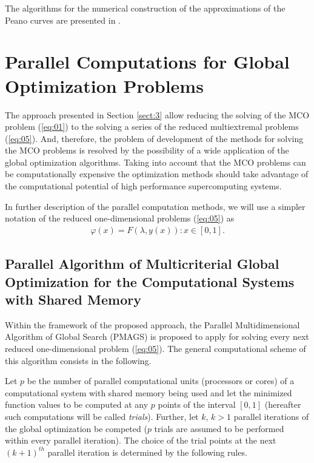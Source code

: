 \documentclass[procedia]{easychair}
\begin{document}
The algorithms for the numerical construction of the approximations of the Peano curves are presented in \cite{c35}.

\section{Parallel Computations for Global Optimization Problems}
\label{sect:4}
The approach presented in Section \ref{sect:3} allow reducing the solving of the MCO problem (\ref{eq:01}) to the solving a series of the reduced multiextremal problems (\ref{eq:05}). And, therefore, the problem of development of the methods for solving the MCO problems is resolved by the possibility of a wide application of the global optimization algorithms. Taking into account that the MCO problems can be computationally expensive the optimization methods should take advantage of the computational potential of high performance supercomputing systems. \par

In further description of the parallel computation methods, we will use a simpler notation of the reduced one-dimensional problems (\ref{eq:05}) as
\begin{eqnarray} \label{eq:07}
\varphi(x) = F(\lambda,y(x)): x \in [0,1]. 
\end{eqnarray}


\subsection{Parallel Algorithm of Multicriterial Global Optimization for the Computational Systems with Shared Memory}
\label{sect:4_1}
Within the framework of the proposed approach, the Parallel Multidimensional Algorithm of Global Search (PMAGS) \cite{c1,c15,c13,c16,c35,c33} is proposed to apply for solving every next reduced one-dimensional problem (\ref{eq:05}). The general computational scheme of this algorithm consists in the following.\par

Let $p$ be the number of parallel computational units (processors or cores) of a computational system with shared memory being used and let the minimized function values to be computed at any $p$ points of the interval $[0,1]$ (hereafter such computations will be called {\it trials}). Further, let $k$, $k>1$ parallel iterations of the global optimization be competed ($p$ trials are assumed to be performed within every parallel iteration). The choice of the trial points at the next $(k+1)^{th}$ parallel iteration is determined by the following rules.\par
\end{document}
